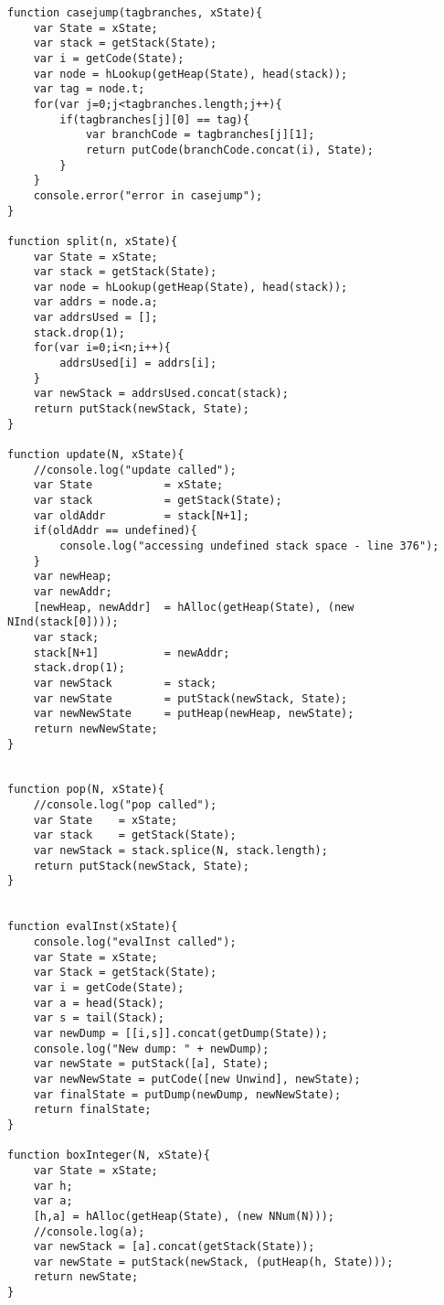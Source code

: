 \begin{verbatim}
function casejump(tagbranches, xState){
    var State = xState;
    var stack = getStack(State);
    var i = getCode(State);
    var node = hLookup(getHeap(State), head(stack));
    var tag = node.t;
    for(var j=0;j<tagbranches.length;j++){
        if(tagbranches[j][0] == tag){
            var branchCode = tagbranches[j][1];
            return putCode(branchCode.concat(i), State);
        }
    }
    console.error("error in casejump");
}

function split(n, xState){
    var State = xState;
    var stack = getStack(State);
    var node = hLookup(getHeap(State), head(stack));
    var addrs = node.a;
    var addrsUsed = [];
    stack.drop(1);
    for(var i=0;i<n;i++){
        addrsUsed[i] = addrs[i];
    }
    var newStack = addrsUsed.concat(stack);
    return putStack(newStack, State);
}

function update(N, xState){
    //console.log("update called");
    var State           = xState;
    var stack           = getStack(State);
    var oldAddr         = stack[N+1];
    if(oldAddr == undefined){
        console.log("accessing undefined stack space - line 376");
    }
    var newHeap;
    var newAddr;
    [newHeap, newAddr]  = hAlloc(getHeap(State), (new NInd(stack[0])));
    var stack;
    stack[N+1]          = newAddr;
    stack.drop(1);
    var newStack        = stack;
    var newState        = putStack(newStack, State);
    var newNewState     = putHeap(newHeap, newState);
    return newNewState;
}


function pop(N, xState){
    //console.log("pop called");
    var State    = xState;
    var stack    = getStack(State);
    var newStack = stack.splice(N, stack.length);
    return putStack(newStack, State);
}  


function evalInst(xState){
    console.log("evalInst called");
    var State = xState;
    var Stack = getStack(State);
    var i = getCode(State);
    var a = head(Stack); 
    var s = tail(Stack);
    var newDump = [[i,s]].concat(getDump(State));
    console.log("New dump: " + newDump);
    var newState = putStack([a], State);
    var newNewState = putCode([new Unwind], newState);
    var finalState = putDump(newDump, newNewState);
    return finalState;
}

function boxInteger(N, xState){
    var State = xState;
    var h;
    var a;
    [h,a] = hAlloc(getHeap(State), (new NNum(N)));
    //console.log(a);
    var newStack = [a].concat(getStack(State));
    var newState = putStack(newStack, (putHeap(h, State)));
    return newState;
}


\end{verbatim}

